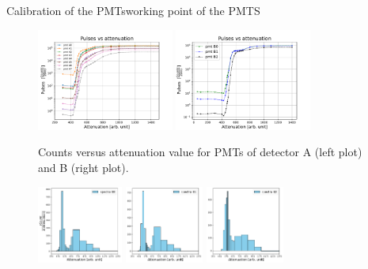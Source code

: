 \documentclass[9pt,a4paper]{beamer}
\begin{document}
\begin{frame}{Calibration of the PMTs}{working point of the PMTS}

\begin{figure}
\includegraphics[width = 0.4\textwidth]{figures/AttenuationScanA.pdf}
\includegraphics[width = 0.4\textwidth]{figures/AttenuationScanB.pdf}
\caption{\footnotesize Counts versus attenuation value for PMTs of detector A (left plot) and B (right plot).}
\end{figure}

\begin{figure}
\centering
\includegraphics[width = 0.25\textwidth]{figures/spettro/B0.pdf}
\includegraphics[width = 0.23\textwidth]{figures/spettro/B1.pdf}
\includegraphics[width = 0.23\textwidth]{figures/spettro/B2.pdf}
\end{figure}
\end{frame}
\end{document}
